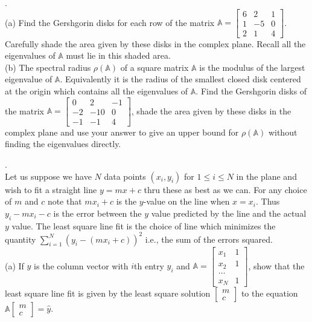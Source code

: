 \documentclass[12 pt]{article}
\begin{document}
\medskip

. \\ (a) Find the Gershgorin disks for each row of the matrix $\mathbb{A} = \begin{bmatrix} 6 & 2 & 1 \\ 1 & -5 & 0 \\ 2 & 1 & 4 \end{bmatrix}$. 
Carefully shade the area given by these disks in the complex plane. Recall all the eigenvalues of $\mathbb{A}$ must lie in this shaded area. \\

\noindent
(b) The spectral radius $\rho(\mathbb{A})$ of a square matrix $\mathbb{A}$ is the modulus of the largest eigenvalue of $\mathbb{A}$. Equivalently 
it is the radius of the smallest closed disk centered at the origin which contains all the eigenvalues of $\mathbb{A}$. Find the Gershgorin 
disks of the matrix $\mathbb{A}=\begin{bmatrix} 0 & 2 & -1 \\ -2 & -10 & 0 \\ -1 & -1 & 4 \end{bmatrix}$, shade the area given by these disks in the complex plane 
and use your answer to give an upper bound for $\rho(\mathbb{A})$ without finding the eigenvalues directly. 

\medskip


. \\ Let us suppose we have $N$ data points $(x_i,y_i)$ for $1 \leq i \leq N$ in the plane and wish to fit a straight line $y=mx+c$ thru these as best as we can. For any choice of $m$ and $c$ note that $mx_i+c$ is the $y$-value on the line when $x=x_i$. Thus $y_i-mx_i-c$ is the error between the $y$ value 
predicted by the line and the actual $y$ value. The least square line fit is the choice of line which minimizes the quantity 
$\sum_{i=1}^N (y_i-(mx_i+c))^2$ i.e., the sum of the errors squared. \\

\noindent
(a) If $\hat{y}$ is the column vector with $i$th entry $y_i$ and 
$\mathbb{A} =\begin{bmatrix} x_1 & 1 \\ x_2 & 1 \\ \dots \\ x_N & 1 \end{bmatrix}$, show that the least square line fit is given by the least square solution 
$\begin{bmatrix} m \\ c \end{bmatrix}$ to the equation $\mathbb{A} \begin{bmatrix} m \\ c \end{bmatrix} = \hat{y}$. \\
\end{document}
